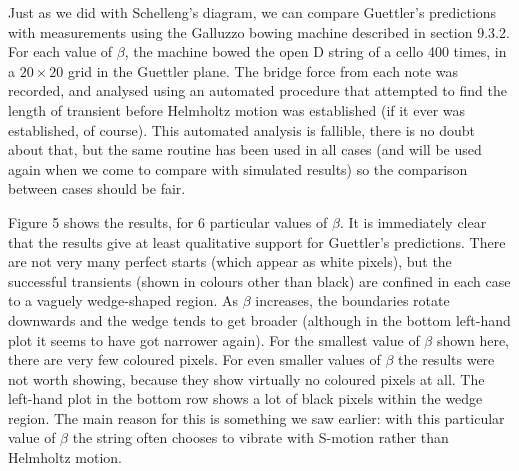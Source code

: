   Just as we did with Schelleng's diagram, we can compare Guettler's 
  predictions with measurements using the Galluzzo bowing machine described in 
  section 9.3.2. For each value of $\beta$, the machine bowed the open D string 
  of a cello 400 times, in a $20\times 20$ grid in the Guettler plane. The 
  bridge force from each note was recorded, and analysed using an automated 
  procedure that attempted to find the length of transient before Helmholtz 
  motion was established (if it ever was established, of course). This 
  automated analysis is fallible, there is no doubt about that, but the same 
  routine has been used in all cases (and will be used again when we come to 
  compare with simulated results) so the comparison between cases should be 
  fair. 

  Figure 5 shows the results, for 6 particular values of $\beta$. It is 
  immediately clear that the results give at least qualitative support for 
  Guettler's predictions. There are not very many perfect starts (which appear 
  as white pixels), but the successful transients (shown in colours other than 
  black) are confined in each case to a vaguely wedge-shaped region. As $\beta$ 
  increases, the boundaries rotate downwards and the wedge tends to get broader 
  (although in the bottom left-hand plot it seems to have got narrower again). 
  For the smallest value of $\beta$ shown here, there are very few coloured 
  pixels. For even smaller values of $\beta$ the results were not worth 
  showing, because they show virtually no coloured pixels at all. The left-hand 
  plot in the bottom row shows a lot of black pixels within the wedge region. 
  The main reason for this is something we saw earlier: with this particular 
  value of $\beta$ the string often chooses to vibrate with S-motion rather 
  than Helmholtz motion. 

